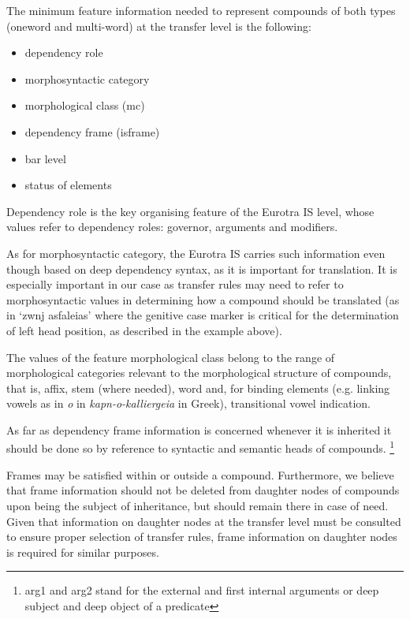 The   minimum  feature information needed to represent  compounds  
of  both types  (oneword and multi-word) at the transfer level is 
the following:

\begin{itemize}
\item dependency role 
\item morphosyntactic category
\item morphological class (mc) 
\item dependency frame (isframe)
\item bar level 
\item status of elements
\end{itemize}

Dependency  role is the key organising feature of the Eurotra  IS 
level,   whose  values  refer  to  dependency  roles: 
governor, arguments and modifiers. 

As  for  morphosyntactic category,  the Eurotra IS  carries  such 
information even though based on deep dependency syntax, as it is 
important for translation. It is especially important in our case 
as transfer rules may need to refer to morphosyntactic values  in 
determining  how  a compound should be translated  (as  in  `zwnj 
asfaleias'  where  the genitive case marker is critical  for  the 
determination of left head position,  as described in the example 
above).

The  values  of the feature morphological class  belong to    the  
range    of    morphological   categories   relevant    to    the 
morphological structure of compounds, that is, affix, stem (where 
needed),      word  and,  for    binding   elements (e.g. linking 
vowels as in {\it o} in {\it kapn-o-kalliergeia} in Greek),
transitional vowel indication.                            

As  far as dependency frame information is concerned whenever  it 
is  inherited it should be done so by reference to syntactic  and 
semantic heads of  compounds.
\footnote{arg1 and arg2 stand for the external and first  internal 
arguments or deep subject and deep object of a predicate}

   Frames  may  be satisfied  within  
or   outside  a compound.  Furthermore,   we  believe  that frame 
information  should   not   be deleted  from  daughter  nodes  of 
compounds  upon being the  subject of  inheritance,   but  should 
remain  there  in  case of  need.   Given  that   information  on 
daughter  nodes  at  the  transfer level must  be  consulted   to  
ensure proper selection of transfer rules,  frame information  on 
daughter nodes is required for similar purposes. 

